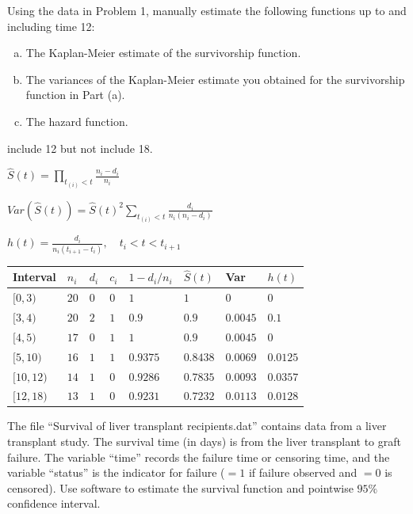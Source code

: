 \documentclass[12pt]{elegantbook}
\begin{document}
    \begin{exercise*}[2]
        Using the data in Problem 1, manually estimate the following functions up to and including time 12: 
        \begin{enumerate}[(a)]
            \item The Kaplan-Meier estimate of the survivorship function.
            \item The variances of the Kaplan-Meier estimate you obtained for the survivorship function in Part (a). 
            \item The hazard function. 
        \end{enumerate}
    \end{exercise*}

    \begin{solution}
        include 12 but not include 18. 

        $\hat{S}(t)=\prod_{t_{(i)}<t}\frac{n_i-d_i}{n_i}$

        $Var(\hat{S}(t))=\hat{S}(t)^2\sum_{t_{(i)}<t}\frac{d_i}{n_i(n_i-d_i)}$

        $h(t)=\frac{d_i}{n_i(t_{i+1}-t_i)},\quad t_i<t<t_{i+1}$
        \begin{table}[H]
        \centering
        \begin{tabular}{llllllll}
        \hline
        Interval & $n_i$ & $d_i$ & $c_i$ & $1-d_i/n_i$ & $\hat{S}(t)$ & Var & $h(t)$ \\ \hline
                $[0,3)$ &  $20$ & $0$  & $0$ & $1$  &     $1$      &   $0$   & $0$  \\
                $[3,4)$ &  $20$ & $2$  &  $1$  &    $0.9$       &  $0.9$   &   $0.0045$ & $0.1$ \\
                $[4,5)$ & $17$  & $0$  &  $1$  &     $1$      &  $0.9$   &    $0.0045$ & $0$ \\
                $[5,10)$ & $16$  & $1$  &  $1$  &    $0.9375$       &  $0.8438$   &   $0.0069$  & $0.0125$ \\
                $[10,12)$ & $14$  &  $1$ &  $0$  &     $0.9286$      &   $0.7835$  &   $0.0093$ & $0.0357$ \\ 
                $[12,18)$ & $13$  &  $1$ &  $0$  &     $0.9231$      &   $0.7232$  &   $0.0113$  & $0.0128$ \\ \hline
        \end{tabular}
        \end{table}
    \end{solution}
    
    \begin{exercise*}[3]
        The file ``Survival of liver transplant recipients.dat'' contains data from a liver transplant study. The survival time (in days) is from the liver transplant to graft failure. The variable “time” records the failure time or censoring time, and the variable ``status'' is the indicator for failure ($=1$ if failure observed and $=0$ is censored). Use software to estimate the survival function and pointwise $95\%$ confidence interval. 
    \end{exercise*}
\end{document}
